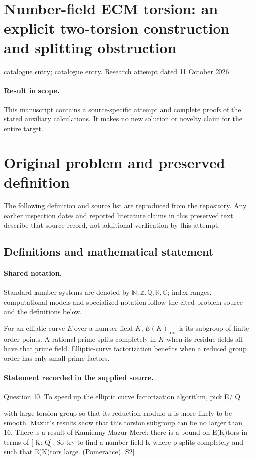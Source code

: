 \documentclass[11pt]{article}
\begin{document}
\section*{Number-field ECM torsion: an explicit two-torsion construction and splitting obstruction}
\noindent catalogue entry; catalogue entry. Research attempt dated 11 October 2026.
\paragraph{Result in scope.}This manuscript contains a source-specific attempt and complete proofs of the stated auxiliary calculations. It makes no new solution or novelty claim for the entire target.
\section{Original problem and preserved definition}
The following definition and source list are reproduced from the repository. Any earlier inspection dates and reported literature claims in this preserved text describe that source record, not additional verification by this attempt.
\subsection{Definitions and mathematical statement}

\paragraph{Shared notation.}Standard number systems are denoted by $\mathbb N,\mathbb Z,\mathbb Q,\mathbb R,\mathbb C$; index ranges, computational models and specialized notation follow the cited problem source and the definitions below.


For an elliptic curve $E$ over a number field $K$, $E(K)_{\mathrm{tors}}$ is its subgroup of finite-order points. A rational prime splits completely in $K$ when its residue fields all have that prime field. Elliptic-curve factorization benefits when a reduced group order has only small prime factors.
\paragraph{Statement recorded in the supplied source.}
Question 10. To speed up the elliptic curve factorization algorithm, pick E/ Q

with large torsion group so that its reduction modulo n is more likely to be smooth. Mazur's results show that this torsion subgroup can be no larger than 16. There is a result of Kamienny-Mazur-Merel: there is a bound on E(K)tors in terms of [ K: Q]. So try to find a number field K where p splits completely and such that E(K)tors large. (Pomerance) \href{https://aimath.org/WWN/primesinp/primesinp.pdf}{[S2]}
\end{document}
